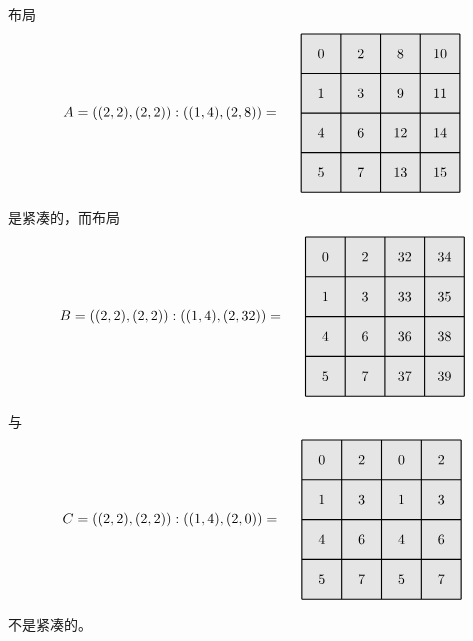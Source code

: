 \begin{example} 布局
\[
\begin{tikzpicture}[x={(0cm,-1cm)},y={(1cm,0cm)},every node/.style={minimum size=1cm, outer sep=0pt}]

\node[fill=gray!20] at (0,0) {0};
\node[fill=gray!20] at (0,1) {2};
\node[fill=gray!20] at (0,2) {8};
\node[fill=gray!20] at (0,3) {10};
\node[fill=gray!20] at (1,0) {1};
\node[fill=gray!20] at (1,1) {3};
\node[fill=gray!20] at (1,2) {9};
\node[fill=gray!20] at (1,3) {11};
\node[fill=gray!20] at (2,0) {4};
\node[fill=gray!20] at (2,1) {6};
\node[fill=gray!20] at (2,2) {12};
\node[fill=gray!20] at (2,3) {14};
\node[fill=gray!20] at (3,0) {5};
\node[fill=gray!20] at (3,1) {7};
\node[fill=gray!20] at (3,2) {13};
\node[fill=gray!20] at (3,3) {15};
\draw[color=black,thick,shift={(-0.5,-0.5)}] (0,0) grid (4,4);

\node[anchor = east] at (1.5,-1) {$A = ((2,2),(2,2)):((1,4),(2,8))=$};
\end{tikzpicture}
\]
是紧凑的，而布局
\[
\begin{tikzpicture}[x={(0cm,-1cm)},y={(1cm,0cm)},every node/.style={minimum size=1cm, outer sep=0pt}]

\node[fill=gray!20] at (0,0) {0};
\node[fill=gray!20] at (0,1) {2};
\node[fill=gray!20] at (0,2) {32};
\node[fill=gray!20] at (0,3) {34};
\node[fill=gray!20] at (1,0) {1};
\node[fill=gray!20] at (1,1) {3};
\node[fill=gray!20] at (1,2) {33};
\node[fill=gray!20] at (1,3) {35};
\node[fill=gray!20] at (2,0) {4};
\node[fill=gray!20] at (2,1) {6};
\node[fill=gray!20] at (2,2) {36};
\node[fill=gray!20] at (2,3) {38};
\node[fill=gray!20] at (3,0) {5};
\node[fill=gray!20] at (3,1) {7};
\node[fill=gray!20] at (3,2) {37};
\node[fill=gray!20] at (3,3) {39};
\draw[color=black,thick,shift={(-0.5,-0.5)}] (0,0) grid (4,4);

\node[anchor = east] at (1.5,-1) {$B = ((2,2),(2,2)):((1,4),(2,32))=$};
\end{tikzpicture}
\]
与
\[
\begin{tikzpicture}[x={(0cm,-1cm)},y={(1cm,0cm)},every node/.style={minimum size=1cm, outer sep=0pt}]

\node[fill=gray!20] at (0,0) {0};
\node[fill=gray!20] at (0,1) {2};
\node[fill=gray!20] at (0,2) {0};
\node[fill=gray!20] at (0,3) {2};
\node[fill=gray!20] at (1,0) {1};
\node[fill=gray!20] at (1,1) {3};
\node[fill=gray!20] at (1,2) {1};
\node[fill=gray!20] at (1,3) {3};
\node[fill=gray!20] at (2,0) {4};
\node[fill=gray!20] at (2,1) {6};
\node[fill=gray!20] at (2,2) {4};
\node[fill=gray!20] at (2,3) {6};
\node[fill=gray!20] at (3,0) {5};
\node[fill=gray!20] at (3,1) {7};
\node[fill=gray!20] at (3,2) {5};
\node[fill=gray!20] at (3,3) {7};
\draw[color=black,thick,shift={(-0.5,-0.5)}] (0,0) grid (4,4);

\node[anchor = east] at (1.5,-1) {$C = ((2,2),(2,2)):((1,4),(2,0))=$};
\end{tikzpicture}
\]
不是紧凑的。
\end{example}

